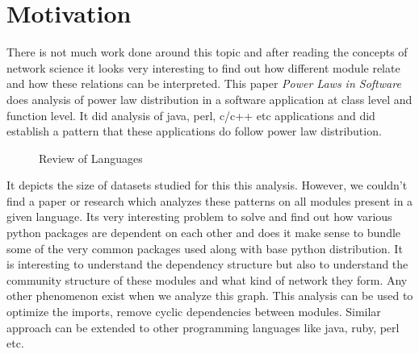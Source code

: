 \section{Motivation} \label{intro}
There is not much work done around this topic and after reading the concepts
of network science it looks very interesting to find out how different module relate and how
these relations can be interpreted. This paper \textit{Power Laws in Software} \cite{louridas2008power} 
does analysis of power law distribution in a software application at class level and function level.
It did analysis of java, perl, c/c++ etc applications and did establish a pattern that 
these applications do follow power law distribution.

\begin{figure}[htbp]
\centering
{}
\caption{Review of Languages}
\label{fig:louridas2008power}
\end{figure}

It depicts the size of datasets studied for this this analysis. However,
we couldn't find a paper or research which analyzes these patterns
 on all modules present in a given language.
Its very interesting problem to solve and find out how various python 
packages are dependent on each other and does it make sense 
to bundle some of the very common packages used along with base 
python distribution. It is interesting to understand the dependency structure 
but also to understand the community structure of these modules and 
what kind of network they form. Any other phenomenon exist when 
we analyze this graph. This analysis can be used to optimize the 
imports, remove cyclic dependencies between modules. Similar 
approach can be extended to other programming languages like java, ruby, perl etc.  